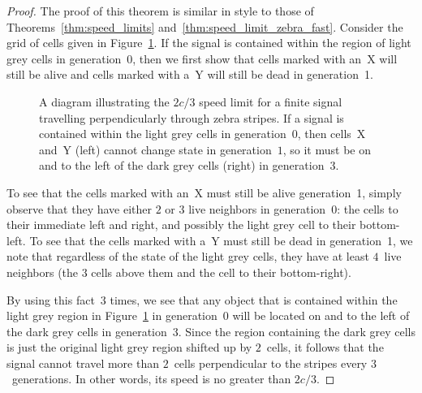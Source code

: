 \begin{proof}
	The proof of this theorem is similar in style to those of Theorems~\ref{thm:speed_limits} and~\ref{thm:speed_limit_zebra_fast}. Consider the grid of cells given in Figure~\ref{fig:speed_limit_zebra}. If the signal is contained within the region of light grey cells in generation~0, then we first show that cells marked with an~X will still be alive and cells marked with a~Y will still be dead in generation~1.
	
	\begin{figure}[!htb]
		\centering
		\begin{minipage}{.44\textwidth}
			\centering{}
		\end{minipage} \quad %
		\begin{minipage}{.52\textwidth}
			\centering{}
		\end{minipage}
		\caption{A diagram illustrating the $2c/3$ speed limit for a finite signal travelling perpendicularly through zebra stripes. If a signal is contained within the light grey cells in generation~$0$, then cells~X and~Y (left) cannot change state in generation~$1$, so it must be on and to the left of the dark grey cells (right) in generation~$3$.}\label{fig:speed_limit_zebra}
	\end{figure}
	
	To see that the cells marked with an~X must still be alive generation~1, simply observe that they have either $2$ or $3$ live neighbors in generation~0: the cells to their immediate left and right, and possibly the light grey cell to their bottom-left. To see that the cells marked with a~Y must still be dead in generation~1, we note that regardless of the state of the light grey cells, they have at least $4$~live neighbors (the $3$ cells above them and the cell to their bottom-right).
	
	By using this fact~$3$ times, we see that any object that is contained within the light grey region in Figure~\ref{fig:speed_limit_zebra} in generation~0 will be located on and to the left of the dark grey cells in generation~3. Since the region containing the dark grey cells is just the original light grey region shifted up by $2$~cells, it follows that the signal cannot travel more than $2$~cells perpendicular to the stripes every $3$~generations. In other words, its speed is no greater than $2c/3$.
\end{proof}

